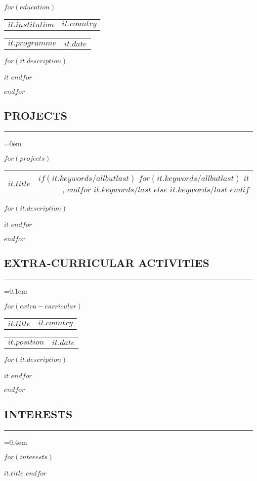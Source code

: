 \documentclass[10pt,letterpaper]{article}
\makeatletter
\newcommand{\headerrow}[2]
{\begin{tabular*}{\linewidth}{l@{\extracolsep{\fill}}r}
	#1 &
	#2 \\
\end{tabular*}}
\makeatother
\begin{document}
    $for(education)$
	\headerrow
		{\textbf{$it.institution$}}
		{\textbf{$it.country$}}
	\vspace{-5pt}
	\headerrow
		{$it.programme$}
		{\emph{$it.date$}}
    \begin{itemize*}
        $for(it.description)$
        \item $it$
        $endfor$
    \end{itemize*}
	\vspace{-4pt}
    $endfor$

\subsection*{PROJECTS}
\vspace{-0.2em}
\hrule
\vspace{0.4em}
	\parskip=0em

    $for(projects)$
    \headerrow
		{\textbf{$it.title$}}
		{
        $if(it.keywords/allbutlast)$
            $for(it.keywords/allbutlast)$
                $it$,
            $endfor$
            $it.keywords/last$
        $else$
            $it.keywords/last$
        $endif$
        }
    \vspace{-16pt}
	\begin{itemize*}
        $for(it.description)$
	    \item $it$
        $endfor$
	\end{itemize*}
	\vspace{-4pt}
    $endfor$

\subsection*{EXTRA-CURRICULAR ACTIVITIES}
\vspace{-0.2em}
\hrule
\vspace{0.4em}
\parskip=0.1em

    $for(extra-curricular)$
	\headerrow
		{\textbf{$it.title$}}
		{\textbf{$it.country$}}
	\vspace{-5pt}
	\headerrow
        {\emph{$it.position$}}
		{\emph{$it.date$}}
    \begin{itemize*}
        $for(it.description)$
        \item $it$
        $endfor$
    \end{itemize*}
	\vspace{-4pt}
    $endfor$

\subsection*{INTERESTS}
\vspace{-0.2em}
\hrule
\vspace{0.4em}
\parskip=0.4em

    \begin{itemize*}
        $for(interests)$
        \item $it.title$
        $endfor$
    \end{itemize*}
	\vspace{-4pt}
\end{document}
